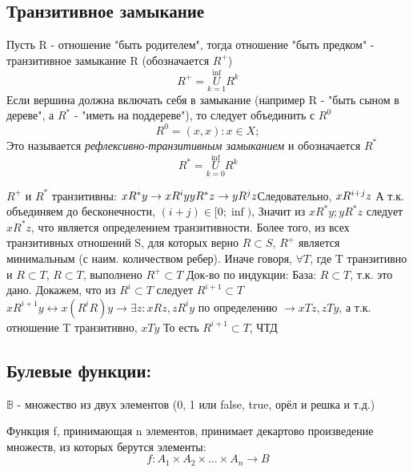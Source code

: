 \documentclass{article}
\begin{document}
\subsection{Транзитивное замыкание} 
Пусть R - отношение "быть родителем", тогда отношение "быть предком" - транзитивное замыкание R (обозначается $ R^{+} $)
\[R^{+} = \overset{\inf}{\underset{k=1}{U}}R^{k}\]
Если вершина должна включать себя в замыкание (например R - "быть сыном в дереве", а $R^{*}$ - "иметь на поддереве"), то следует объединить с $R^{0}$
\[R^{0} = (x, x): x \in X; \]
Это называется \textit{рефлексивно-транзитивным замыканием} и обозначается $R^{*}$
\[R^{*} = \overset{\inf}{\underset{k=0}{U}}R^{k}\]

$R^{+}$ и $R^{*}$ транзитивны:
$ \newline
xR^{*}y \rightarrow xR^{i}y \newline 
yR^{*}z \rightarrow yR^{j}z \newline
$Следовательно, $ xR^{i+j}z \newline 
$ А т.к. объединяем до бесконечности, $(i+j) \in [0; \inf) $, Значит из $ xR^{*}y; yR^{*}z $ следует $ xR^{*}z $, что является определением транзитивности.
Более того, из всех транзитивных отношений S, для которых верно $ R \subset S $, $R^{+}$ является минимальным (с наим. количеством ребер).
Иначе говоря, $\forall T$, где T транзитивно и $R \subset T$, $R \subset T$, выполнено $R^{+} \subset T$ \newline
Док-во по индукции:\newline
База: $R \subset T$, т.к. это дано.\newline
Докажем, что из $ R^{i} \subset T $ следует $ R^{i+1} \subset T $ \newline
$ xR^{i+1}y \leftrightarrow x(R^{i}R)y \rightarrow \exists z: xRz, zR^iy $ по определению \newline
$ \rightarrow xTz, zTy$, а т.к. отношение T транзитивно, $xTy$ \newline То есть $ R^{i+1} \subset T $, ЧТД

\subsection{Булевые функции:}
$ \mathbb{B} $ - множество из двух элементов ({0, 1} или {false, true}, {орёл и решка} и т.д.)

Функция f, принимающая n элементов, принимает декартово произведение множеств, из которых берутся элементы:
\[ f: A_1 \times A_2 \times ... \times A_n \longrightarrow B\]
\end{document}
